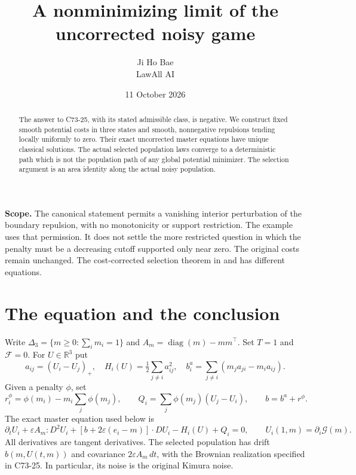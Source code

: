 \documentclass[11pt,a4paper]{article}
\title{A nonminimizing limit of the uncorrected noisy game}
\author{Ji Ho Bae\\\small LawAll AI}
\date{11 October 2026}
\newcommand{\R}{\mathbb R}
\newcommand{\F}{\mathcal F}
\newcommand{\G}{\mathcal G}
\newcommand{\dt}{\,dt}
\begin{document}
\maketitle
\begin{abstract}
The answer to C73-25, with its stated admissible class, is negative.
We construct fixed smooth potential costs in three states and smooth,
nonnegative repulsions tending locally uniformly to zero. Their exact
uncorrected master equations have unique classical solutions. The actual
selected population laws converge to a deterministic path which is not
the population path of any global potential minimizer. The selection
argument is an area identity along the actual noisy population.
\end{abstract}

\textbf{Scope.} The canonical statement permits a vanishing interior
perturbation of the boundary repulsion, with no monotonicity or support
restriction. The example uses that permission. It does not settle the
more restricted question in which the penalty must be a decreasing
cutoff supported only near zero. The original costs remain unchanged.
The cost-corrected selection theorem in
\cite[Theorem 4.5, p.~3692]{CD} and \cite{CeD} has different
equations.

\section{The equation and the conclusion}
Write $\Delta_3=\{m\geq0:\sum_i m_i=1\}$ and
$A_m=\operatorname{diag}(m)-mm^\top$. Set $T=1$ and $\F=0$.
For $U\in\R^3$ put
\[
 a_{ij}=(U_i-U_j)_+,
 \quad H_i(U)=\tfrac12\sum_{j\ne i}a_{ij}^2,
 \quad b_i^a=\sum_{j\ne i}(m_ja_{ji}-m_ia_{ij}).
\]
Given a penalty $\phi$, set
\[
 r_i^\phi=\phi(m_i)-m_i\sum_j\phi(m_j),\qquad
 Q_i=\sum_j\phi(m_j)(U_j-U_i),\qquad b=b^a+r^\phi.
\]
The exact master equation used below is
\begin{equation}\label{master}
 \partial_tU_i+\varepsilon A_m:D^2U_i
 +[b+2\varepsilon(e_i-m)]\cdot DU_i-H_i(U)+Q_i=0,
 \qquad U_i(1,m)=\partial_i\G(m).
\end{equation}
All derivatives are tangent derivatives. The selected population has
drift $b(m,U(t,m))$ and covariance $2\varepsilon A_m\dt$, with the
Brownian realization specified in C73-25. In particular, its noise is
the original Kimura noise.
\end{document}

